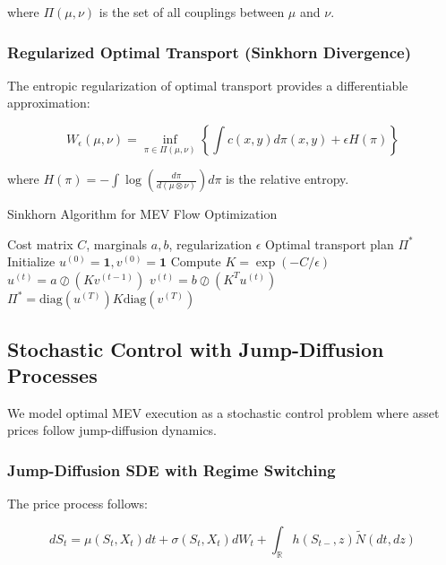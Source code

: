 \documentclass[12pt]{article}
\begin{document}
where $\Pi(\mu,\nu)$ is the set of all couplings between $\mu$ and $\nu$.

\subsubsection{Regularized Optimal Transport (Sinkhorn Divergence)}

The entropic regularization of optimal transport provides a differentiable approximation:

\begin{equation}
W_{\epsilon}(\mu, \nu) = \inf_{\pi \in \Pi(\mu,\nu)} \left\{\int c(x,y) d\pi(x,y) + \epsilon H(\pi)\right\}
\end{equation}

where $H(\pi) = -\int \log(\frac{d\pi}{d(\mu \otimes \nu)}) d\pi$ is the relative entropy.

\begin{algorithm}
\caption{Sinkhorn Algorithm for MEV Flow Optimization}
\label{alg:sinkhorn}
\begin{algorithmic}[1]
\REQUIRE Cost matrix $C$, marginals $a, b$, regularization $\epsilon$
\ENSURE Optimal transport plan $\Pi^*$
\STATE Initialize $u^{(0)} = \mathbf{1}, v^{(0)} = \mathbf{1}$
\STATE Compute $K = \exp(-C/\epsilon)$
    \STATE $u^{(t)} = a \oslash (K v^{(t-1)})$
    \STATE $v^{(t)} = b \oslash (K^T u^{(t)})$
\ENDFOR
\RETURN $\Pi^* = \text{diag}(u^{(T)}) K \text{diag}(v^{(T)})$
\end{algorithmic}
\end{algorithm}

\subsection{Stochastic Control with Jump-Diffusion Processes}

We model optimal MEV execution as a stochastic control problem where asset prices follow jump-diffusion dynamics.

\subsubsection{Jump-Diffusion SDE with Regime Switching}

The price process follows:

\begin{equation}
dS_t = \mu(S_t, X_t) dt + \sigma(S_t, X_t) dW_t + \int_{\mathbb{R}} h(S_{t-}, z) \tilde{N}(dt, dz)
\end{equation}
\end{document}
